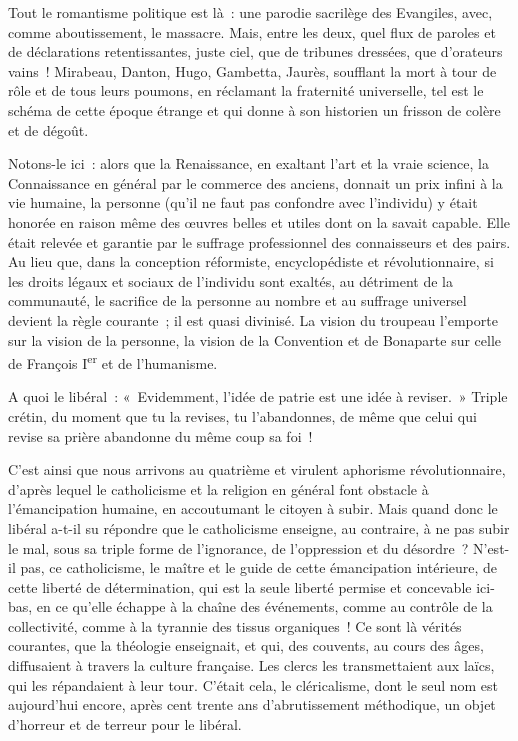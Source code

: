 \documentclass[french,twoside]{book} %
\begin{document}
\noindent Tout le romantisme politique est là : une parodie sacrilège des Evangiles, avec, comme aboutissement, le massacre. Mais, entre les deux, quel flux de paroles et de déclarations retentissantes, juste ciel, que de tribunes dressées, que d’orateurs vains ! Mirabeau, Danton, Hugo, Gambetta, Jaurès, soufflant la mort à tour de rôle et de tous leurs poumons, en réclamant la fraternité universelle, tel est le schéma de cette époque étrange et qui donne à son historien un frisson de colère et de dégoût.\par
Notons-le ici : alors que la Renaissance, en exaltant l’art et la vraie science, la Connaissance en général par le commerce des anciens, donnait un prix infini à la vie humaine, la personne (qu’il ne faut pas confondre avec l’individu) y était honorée en raison même des œuvres belles et utiles dont on la savait capable. Elle était relevée et garantie par le suffrage professionnel des connaisseurs et des pairs. Au lieu que, dans la conception réformiste, encyclopédiste et révolutionnaire, si les droits légaux et sociaux de l’individu sont exaltés, au détriment de la communauté, le sacrifice de la personne au nombre et au suffrage universel devient la règle courante ; il est quasi divinisé. La vision du troupeau l’emporte sur la vision de la personne, la vision de la Convention et de Bonaparte sur celle de François I\textsuperscript{er} et de l’humanisme.\par
A quoi le libéral : « Evidemment, l’idée de patrie est une idée à reviser. » Triple crétin, du moment que tu la revises, tu l’abandonnes, de même que celui qui revise sa prière abandonne du même coup sa foi !\par
C’est ainsi que nous arrivons au quatrième et virulent aphorisme révolutionnaire, d’après lequel le catholicisme et la religion en général font obstacle à l’émancipation humaine, en accoutumant le citoyen à subir. Mais quand donc le libéral a-t-il su répondre que le catholicisme enseigne, au contraire, à ne pas subir le mal, sous sa triple forme de l’ignorance, de l’oppression et du désordre ? N’est-il pas, ce catholicisme, le maître et le guide de cette émancipation intérieure, de cette liberté de détermination, qui est la seule liberté permise et concevable ici-bas, en ce qu’elle échappe à la chaîne des événements, comme au contrôle de la collectivité, comme à la tyrannie des tissus organiques ! Ce sont là vérités courantes, que la théologie enseignait, et qui, des couvents, au cours des âges, diffusaient à travers la culture française. Les clercs les transmettaient aux laïcs, qui les répandaient à leur tour. C’était cela, le cléricalisme, dont le seul nom est aujourd’hui encore, après cent trente ans d’abrutissement méthodique, un objet d’horreur et de terreur pour le libéral.\par
\end{document}

